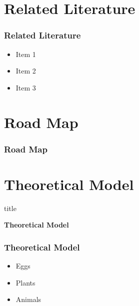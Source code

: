 \documentclass[11pt]{beamer}
\begin{document}
\section[Literature]{Related Literature}
	\begin{frame}

	\frametitle{\bfseries Related Literature}
	
		\begin{itemize}
			\item<1-> Item 1
			\item<2-> Item 2 
			\item<3-> Item 3
		\end{itemize}
		
	\end{frame}
\section{Road Map}
\begin{frame}

	\frametitle{\bfseries Road Map}\label{map}
\tableofcontents[sections={4-}]
	
\end{frame}
\section[Theoretical]{Theoretical Model}
\begin{frame}

	
	\begin{beamercolorbox}{title}
		\begin{center}
			\bfseries \huge Theoretical Model
		\end{center}
	\end{beamercolorbox}

\end{frame}

\begin{frame}
	\frametitle{\bfseries Theoretical Model}

		\begin{itemize}
			\item<1-> Eggs
			\item<2-> Plants
			\item<3-> Animals
		\end{itemize}

	
\end{frame}
\end{document}
